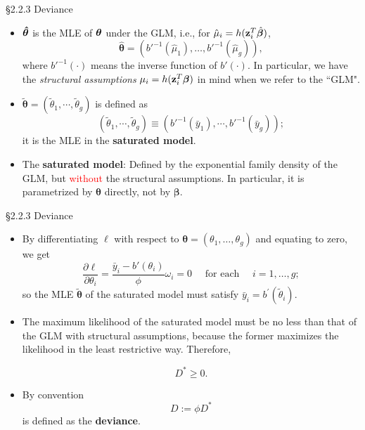\documentclass{beamer}
\newcommand{\boldbeta}{{\boldsymbol \beta}}
\newcommand{\boldtheta}{{\boldsymbol \theta}}
\begin{document}
\begin{frame}{\S2.2.3 Deviance }

\begin{itemize}
\item

 $\mbox{\boldmath $\hat{\theta}$}$ is the MLE of
$\mbox{\boldmath $\theta$}$ under the GLM, i.e., for  $\hat{\mu}_i = h({\bf z}_i^T \hat{\boldbeta})$,
\[
\hat{\boldtheta} = (b'^{-1} (\hat{\mu}_1), \dots, b'^{-1} (\hat{\mu}_g)),
\]
where $b'^{-1}(\cdot)$ means the inverse function of $b'(\cdot)$. In particular, we have the \emph{structural assumptions} $\mu_i = h({\bf z}_i^T \boldbeta)$ in mind when we refer to the ``GLM".


\item $\tilde{\boldtheta}=(\tilde{\theta}_1,\cdots, \tilde{\theta}_g)$ is defined as
\[
(\tilde{\theta}_1,\cdots, \tilde{\theta}_g) \equiv 
\left(b'^{-1}(\bar{y}_1),\cdots,b'^{-1}(\bar{y}_g) \right);
\]
it is the MLE in the {\bf saturated model}.

\item The {\bf saturated model}: Defined by the exponential family density of the GLM, but \textcolor{red}{without} the structural assumptions. In particular, it is parametrized by $\boldtheta$ directly, not by $\boldbeta$.

\end{itemize}

\end{frame}

\begin{frame}{\S2.2.3 Deviance  }
\begin{itemize}

\item
By differentiating $\ell$ with respect to $\boldtheta = (\theta_1, \dots, \theta_g)$ and equating  to zero, we get
\[
\frac{\partial \ell}{ \partial \theta_i} =  \frac{\bar{y}_i - b'(\theta_i)}{ \phi} \omega_i = 0 \quad \text{ for each } \quad i = 1, \dots, g;
\]
so the MLE $\tilde{\boldtheta}$ of the saturated model
must satisfy $\bar{y}_i=b^\prime(\tilde{\theta}_i)$. 


\item

The maximum likelihood of the saturated model must be no less than that of the  GLM with structural assumptions, because the former maximizes the likelihood in the least restrictive way.
Therefore, 

\[
D^*\geq 0.
\] 
\item

By convention
\[
D:=\phi D^*
\]
is defined as  the \textbf{deviance}.



\end{itemize}
\end{frame}
\end{document}
